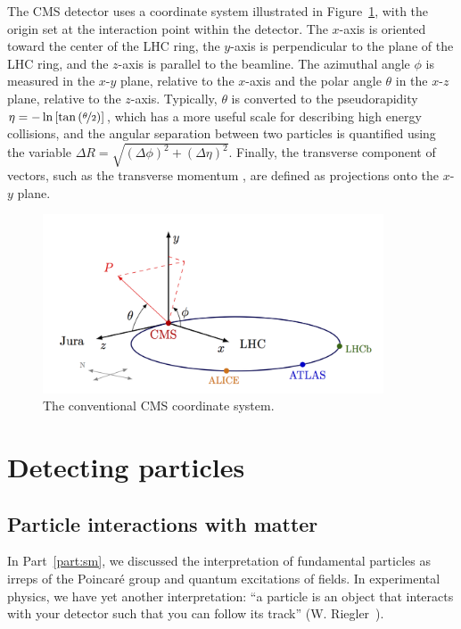 The CMS detector uses a coordinate system illustrated in Figure~\ref{fig:02_cms_coords}, with the origin set at the interaction point within the detector. 
The $x$-axis is oriented toward the center of the LHC ring, the $y$-axis is perpendicular to the plane of the LHC ring, and the $z$-axis is parallel to the beamline.
The azimuthal angle $\phi$ is measured in the $x$-$y$ plane, relative to the $x$-axis and the polar angle $\theta$ in the $x$-$z$ plane, relative to the $z$-axis.
Typically, $\theta$ is converted to the pseudorapidity $\eta = -\ln \left[ \tan \left( \nicefrac{\theta}{2} \right) \right]$, which has a more useful scale for describing high energy collisions, and the angular separation between two particles is quantified using the variable $\Delta R = \sqrt{ (\Delta \phi)^2 + (\Delta \eta)^2 }$.
Finally, the transverse component of vectors, such as the transverse momentum \pt, are defined as projections onto the $x$-$y$ plane.

\begin{figure}[ht]
    \centering
    \captionsetup{justification=centering}
    \includegraphics[width=0.9\textwidth]{figures/02-CMS/cms/coordinate.png}
    \caption{The conventional CMS coordinate system.}
    \label{fig:02_cms_coords}
\end{figure}

\section{Detecting particles}
\label{sec:02_cms_particles}

\subsection{Particle interactions with matter}
\label{sec:02_cms_interactions}

In Part~\ref{part:sm}, we discussed the interpretation of fundamental particles as irreps of the Poincar\'e group and quantum excitations of fields.
In experimental physics, we have yet another interpretation: ``a particle is an object that interacts with your detector such that you can follow its track'' (W. Riegler~\cite{Riegler2013}).

